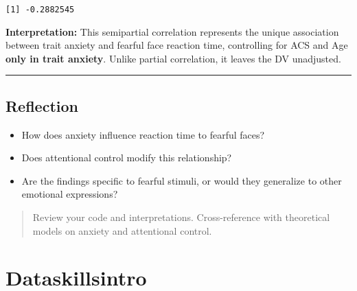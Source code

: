 \documentclass[
  letterpaper,
  DIV=11,
  numbers=noendperiod]{scrreprt}
\providecommand{\tightlist}{%
  \setlength{\itemsep}{0pt}\setlength{\parskip}{0pt}}\usepackage{longtable,booktabs,array}
\begin{document}
\begin{verbatim}
[1] -0.2882545
\end{verbatim}

\begin{tcolorbox}[enhanced jigsaw, colframe=quarto-callout-note-color-frame, leftrule=.75mm, breakable, toprule=.15mm, arc=.35mm, rightrule=.15mm, colback=white, opacityback=0, bottomrule=.15mm, left=2mm]
\begin{minipage}[t]{5.5mm}
\textcolor{quarto-callout-note-color}{\faInfo}
\end{minipage}%
\begin{minipage}[t]{\textwidth - 5.5mm}

\textbf{Interpretation:} This semipartial correlation represents the
unique association between trait anxiety and fearful face reaction time,
controlling for ACS and Age \textbf{only in trait anxiety}. Unlike
partial correlation, it leaves the DV unadjusted.

\end{minipage}%
\end{tcolorbox}

\begin{center}\rule{0.5\linewidth}{0.5pt}\end{center}

\section{Reflection}\label{reflection}

\begin{itemize}
\tightlist
\item
  How does anxiety influence reaction time to fearful faces?
\item
  Does attentional control modify this relationship?
\item
  Are the findings specific to fearful stimuli, or would they generalize
  to other emotional expressions?
\end{itemize}

\begin{quote}
Review your code and interpretations. Cross-reference with theoretical
models on anxiety and attentional control.
\end{quote}

\chapter*{Dataskillsintro}\label{dataskillsintro}
\end{document}
